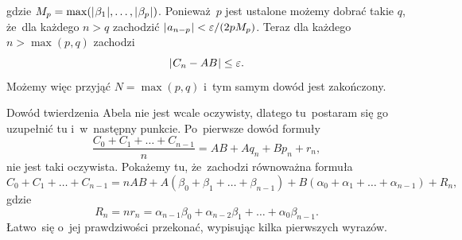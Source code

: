 \documentclass[a4paper,11pt]{article}
\numberwithin{equation}{section}
\begin{document}
gdzie
$M_{ p } = \max( | \hspace{0.05em}  \beta_{ 1 }  \hspace{0.05em} |, \ldots, | \hspace{0.05em}  \beta_{ p }  \hspace{0.05em} | )$.
Ponieważ~$p$ jest ustalone możemy dobrać takie $q$, że~dla każdego
$n > q$ zachodzić
$| \hspace{0.05em}  a_{ n - p }  \hspace{0.05em} | < \varepsilon / ( 2 p M_{ p } )$. Teraz dla każdego
$n > \max( p, q )$ zachodzi
\begin{equation}
  \label{eq:Leja-Funkcje-zespolone-18}
  | \hspace{0.05em}  C_{ n } - A B  \hspace{0.05em} | \leq \varepsilon.
\end{equation}
Możemy więc przyjąć $N = \max( p, q )$ i~tym samym dowód jest
zakończony.

\VerSpaceFour





\noindent
{} Dowód twierdzenia Abela nie jest wcale oczywisty, dlatego
tu~postaram się go uzupełnić tu i~w~następny punkcie. Po~pierwsze dowód
formuły
\begin{equation}
  \label{eq:Leja-Funkcje-zespolone-19}
  \frac{ C_{ 0 } + C_{ 1 } + \ldots + C_{ n - 1 } }{ n } =
  AB + A q_{ n } + B p_{ n } + r_{ n },
\end{equation}
nie jest taki oczywista. Pokażemy tu, że~zachodzi równoważna formuła
\begin{equation}
  \label{eq:Leja-Funkcje-zespolone-20}
  C_{ 0 } + C_{ 1 } + \ldots + C_{ n - 1 } =
  n AB + A ( \beta_{ 0 } + \beta_{ 1 } + \ldots + \beta_{ n - 1 } )
  + B ( \alpha_{ 0 } + \alpha_{ 1 } + \ldots + \alpha_{ n - 1 } ) + R_{ n },
\end{equation}
gdzie
\begin{equation}
  \label{eq:Leja-Funkcje-zespolone-21}
  R_{ n } = n r_{ n } =
  \alpha_{ n - 1 } \beta_{ 0 } + \alpha_{ n - 2 } \beta_{ 1 } + \ldots + \alpha_{ 0 } \beta_{ n - 1 }.
\end{equation}
Łatwo~się o~jej prawdziwości przekonać, wypisując kilka pierwszych
wyrazów.
\end{document}

